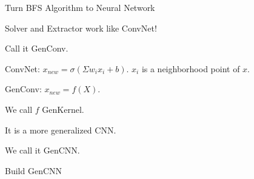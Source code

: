 \documentclass[serif]{beamer}
\begin{document}
\begin{frame}{Turn BFS Algorithm to Neural Network}

	Solver and Extractor work like ConvNet!

	Call it GenConv.

	ConvNet: $x_{new} = \sigma(\Sigma w_ix_i + b)$. $x_i$ is a neighborhood point of $x$.

	GenConv: $x_{new} = f(X)$.

	We call $f$ GenKernel.

	It is a more generalized CNN.

	We call it GenCNN.

\end{frame}

\begin{frame}{Build GenCNN}


\end{frame}
\end{document}
